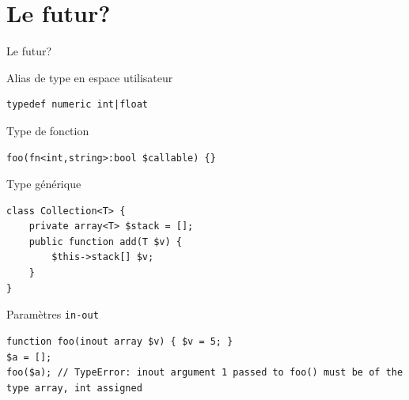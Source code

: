 \documentclass[10pt]{beamer}
\begin{document}
\section{Le futur?}
\begin{frame}[fragile]{Le futur?}
    \begin{description}
        \item Alias de type en espace utilisateur
            \begin{verbatim}
typedef numeric int|float
            \end{verbatim}
        \item Type de fonction
            \begin{verbatim}
foo(fn<int,string>:bool $callable) {} 
            \end{verbatim}
        \item Type générique
            \begin{verbatim}
class Collection<T> {
    private array<T> $stack = [];
    public function add(T $v) {
        $this->stack[] $v;
    }
}
            \end{verbatim}
        \item Paramètres \texttt{in-out}
            \begin{verbatim}
function foo(inout array $v) { $v = 5; }
$a = [];
foo($a); // TypeError: inout argument 1 passed to foo() must be of the type array, int assigned
            \end{verbatim}
    \end{description}
\end{frame}
\end{document}
